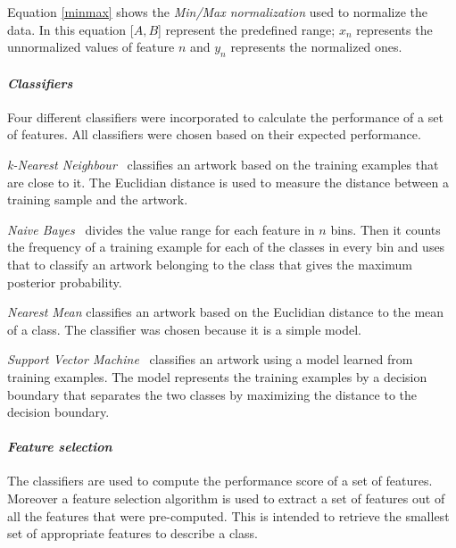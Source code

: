 Equation \ref{minmax} shows the \textit{Min/Max normalization} used to normalize the data.
In this equation [$A, B$] represent the predefined range; $x_n$ represents the unnormalized values of feature $n$ and $y_n$ represents the normalized ones.\\

\paragraph{\textit{Classifiers}}
Four different classifiers were incorporated to calculate the performance of a set of features.
All classifiers were chosen based on their expected performance.%

\textit{k-Nearest Neighbour}~\cite{korn1996fast} classifies an artwork based on the training examples that are close to it.
The Euclidian distance is used to measure the distance between a training sample and the artwork.

\textit{Naive Bayes}~\cite{keren2003recognizing} divides the value range for each feature in $n$ bins.
Then it counts the frequency of a training example for each of the classes in every bin and uses that to classify an artwork belonging to the class that gives the maximum posterior probability.

\textit{Nearest Mean} classifies an artwork based on the Euclidian distance to the mean of a class.
The classifier was chosen because it is a simple model.

\textit{Support Vector Machine}~\cite{chapelle1999svms} classifies an artwork using a model learned from training examples.
The model represents the training examples by a decision boundary that separates the two classes by maximizing the distance to the decision boundary.

\paragraph{\textit{Feature selection}}
The classifiers are used to compute the performance score of a set of features.
Moreover a feature selection algorithm is used to extract a set of features out of all the features that were pre-computed.
This is intended to retrieve the smallest set of appropriate features to describe a class.

